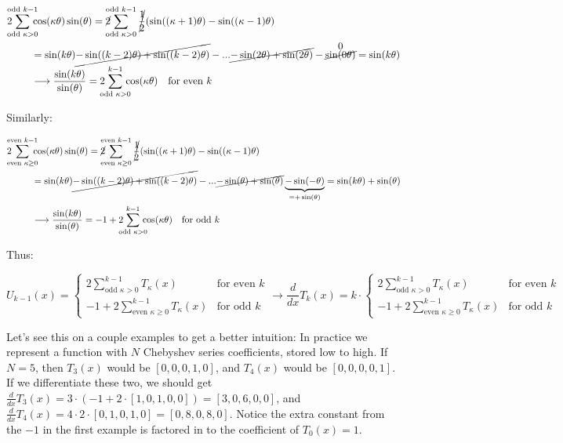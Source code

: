 \documentclass[10pt]{article}
\begin{document}
\begin{align*}
2\!\!\!\!\sum_{\text{odd }\kappa>0}^{\text{odd }k-1} \!\!\!\!&\cos(\kappa\theta)\sin(\theta) = \cancel{2}\!\!\!\!\sum_{\text{odd } \kappa>0}^{\text{odd }k-1} \cancel{\frac{1}{2}}(\sin((\kappa+1)\theta) - \sin((\kappa-1)\theta)\\
&= \sin(k\theta) \cancel{-\sin((k-2)\theta) + \sin((k-2)\theta)} - ... \cancel{-\sin(2\theta) + \sin(2\theta)} - \overset{\text{\normalsize 0}}{\cancel{\sin(0\theta)}} = \sin(k\theta)\\
&\longrightarrow \frac{\sin(k\theta)}{\sin(\theta)} = 2\!\!\!\!\sum_{\text{odd }\kappa>0}^{k-1} \!\!\!\!\cos(\kappa\theta) \quad \text{for even }k
\end{align*}

Similarly:

\begin{align*}
2\!\!\!\!\sum_{\text{even }\kappa \geq 0}^{\text{even }k-1} \!\!\!\!&\cos(\kappa\theta)\sin(\theta) = \cancel{2}\!\!\!\!\sum_{\text{even } \kappa \geq 0}^{\text{even }k-1} \cancel{\frac{1}{2}}(\sin((\kappa+1)\theta) - \sin((\kappa-1)\theta)\\
&= \sin(k\theta) \cancel{-\sin((k-2)\theta) + \sin((k-2)\theta)} - ... \cancel{-\sin(\theta) + \sin(\theta)} \underbrace{-\sin(-\theta)}_{=+\sin(\theta)} = \sin(k\theta) + \sin(\theta)\\
&\longrightarrow \frac{\sin(k\theta)}{\sin(\theta)} = -1 + 2\!\!\!\!\sum_{\text{odd }\kappa>0}^{k-1} \!\!\!\!\cos(\kappa\theta) \quad \text{for odd }k
\end{align*}

Thus:

$$U_{k-1}(x) = \begin{cases}
2\sum_{\text{odd } \kappa>0}^{k-1} T_\kappa(x) & \text{for even } k \\
-1 + 2\sum_{\text{even } \kappa \geq 0}^{k-1} T_\kappa(x) & \text{for odd } k
\end{cases}\longrightarrow \frac{d}{dx} T_k(x) = k \cdot \begin{cases}
2\sum_{\text{odd } \kappa>0}^{k-1} T_\kappa(x) & \text{for even } k \\
-1 + 2\sum_{\text{even } \kappa \geq 0}^{k-1} T_\kappa(x) & \text{for odd } k
\end{cases}$$

Let's see this on a couple examples to get a better intuition: In practice we represent a function with $N$ Chebyshev series coefficients, stored low to high. If $N=5$, then $T_3(x)$ would be $[0, 0, 0, 1, 0]$, and $T_4(x)$ would be $[0, 0, 0, 0, 1]$. If we differentiate these two, we should get $\frac{d}{dx}T_3(x) = 3 \cdot(-1 + 2 \cdot [1, 0, 1, 0, 0]) = [3, 0, 6, 0, 0]$, and $\frac{d}{dx}T_4(x) = 4 \cdot 2 \cdot [0, 1, 0, 1, 0] = [0, 8, 0, 8, 0]$. Notice the extra constant from the $-1$ in the first example is factored in to the coefficient of $T_0(x) = 1$.
\end{document}
